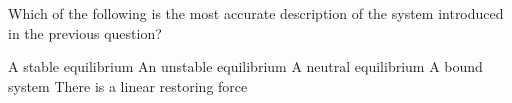 \documentclass{../../oss-apphys-exam}
\begin{document}
\begin{multicols*}{2}
\begin{questions}
    \question Which of the following is the most accurate description of the
    system introduced in the previous question?
    \label{q:well2}
    \begin{choices}
      \choice A stable equilibrium
      \choice An unstable equilibrium
      \choice A neutral equilibrium
      \choice A bound system
      \choice There is a linear restoring force
    \end{choices}
    \columnbreak
    

    

\end{questions}
\end{multicols*}
\end{document}
